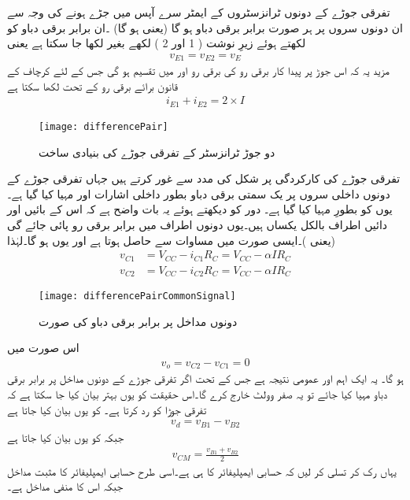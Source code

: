 تفرقی جوڑے کے دونوں ٹرانزسٹروں کے ایمٹر سرے آپس میں جڑے ہونے کی وجہ سے ان دونوں سروں پر ہر صورت برابر برقی دباو ہو گا (یعنی  ہو گا) ۔ان برابر برقی دباو کو لکھتے ہوئے  زیرِ نوشت ( 1 اور 2 ) لکھے بغیر  لکھا جا سکتا ہے یعنی
\begin{align}
v_{E1}=v_{E2}=v_E
\end{align}
مزید یہ کہ اس جوڑ پر پیدا  کار برقی رو کی برقی رو   اور  میں تقسیم ہو گی جس کے لئے کرچاف کے قانون برائے برقی رو کے تحت لکھا سکتا ہے
\begin{align} \label{مساوات_تفرقی_کل_رو_قطعی}
i_{E1}+i_{E2}=2 \times I
\end{align}
%
\begin{figure}
\centering
\texttt{[image: differencePair]}
\caption{دو جوڑ ٹرانزسٹر کے تفرقی جوڑے کی بنیادی ساخت}
\label{شکل_تفرقی_جوڑے_کی_بنیادی_ساخت}
\end{figure}
%
تفرقی جوڑے کی کارکردگی پر شکل  کی مدد سے غور کرتے ہیں جہاں تفرقی جوڑے کے دونوں داخلی سروں پر یک سمتی برقی دباو    بطور داخلی اشارات  اور   مہیا کیا گیا ہے۔یوں  کو بطورِ   مہیا کیا گیا ہے۔ دور کو دیکھتے ہوئے یہ بات واضح ہے کہ اس کے بائیں اور دائیں اطراف بالکل یکساں ہیں۔یوں دونوں اطراف میں برابر برقی رو پائی جائے گی (یعنی )۔ایسی صورت میں مساوات   سے    حاصل ہوتا ہے اور یوں  ہو گا۔لہٰذا
\begin{align*}
v_{C1}&=V_{CC}-i_{C1} R_C=V_{CC}-\alpha I R_C\\
v_{C2}&=V_{CC}-i_{C2}R_C=V_{CC}-\alpha I R_C
\end{align*}
%
\begin{figure}
\centering
\texttt{[image: differencePairCommonSignal]}
\caption{ دونوں مداخل پر برابر برقی دباو کی صورت}
\label{شکل_دونوں_مداخل_پر_برابر_برقی_دباو}
\end{figure}
اس صورت میں
\begin{align}
v_o=v_{C2}-v_{C1}=0
\end{align}
ہو گا۔ یہ ایک اہم اور عمومی نتیجہ ہے جس کے تحت اگر تفرقی جوڑے کے دونوں مداخل پر برابر برقی دباو مہیا کیا جائے تو یہ صفر وولٹ خارج کرے گا۔اس حقیقت کو یوں بہتر بیان کیا جا سکتا ہے کہ تفرقی جوڑا  کو رد کرتا ہے۔   کو یوں بیان کیا جاتا ہے
\begin{align}
v_d=v_{B1}-v_{B2}
\end{align}
جبکہ   کو یوں بیان کیا جاتا ہے
\begin{align}
v_{CM}=\frac{v_{B1}+v_{B2}}{2}
\end{align}
یہاں رک کر تسلی کر لیں کہ  حسابی ایمپلیفائر کا  ہی ہے۔اسی طرح   حسابی ایمپلیفائر کا مثبت مداخل جبکہ   اس کا منفی  مداخل ہے۔

